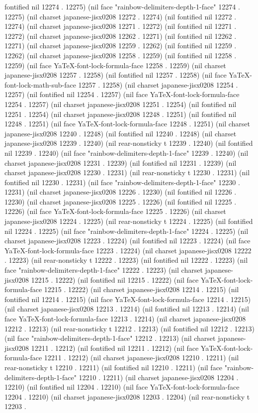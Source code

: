 fontified nil 12274 . 12275) (nil face "rainbow-delimiters-depth-1-face" 12274 . 12275) (nil charset japanese-jisx0208 12272 . 12274) (nil fontified nil 12272 . 12274) (nil charset japanese-jisx0208 12271 . 12272) (nil fontified nil 12271 . 12272) (nil charset japanese-jisx0208 12262 . 12271) (nil fontified nil 12262 . 12271) (nil charset japanese-jisx0208 12259 . 12262) (nil fontified nil 12259 . 12262) (nil charset japanese-jisx0208 12258 . 12259) (nil fontified nil 12258 . 12259) (nil face YaTeX-font-lock-formula-face 12258 . 12259) (nil charset japanese-jisx0208 12257 . 12258) (nil fontified nil 12257 . 12258) (nil face YaTeX-font-lock-math-sub-face 12257 . 12258) (nil charset japanese-jisx0208 12254 . 12257) (nil fontified nil 12254 . 12257) (nil face YaTeX-font-lock-formula-face 12254 . 12257) (nil charset japanese-jisx0208 12251 . 12254) (nil fontified nil 12251 . 12254) (nil charset japanese-jisx0208 12248 . 12251) (nil fontified nil 12248 . 12251) (nil face YaTeX-font-lock-formula-face 12248 . 12251) (nil charset japanese-jisx0208 12240 . 12248) (nil fontified nil 12240 . 12248) (nil charset japanese-jisx0208 12239 . 12240) (nil rear-nonsticky t 12239 . 12240) (nil fontified nil 12239 . 12240) (nil face "rainbow-delimiters-depth-1-face" 12239 . 12240) (nil charset japanese-jisx0208 12231 . 12239) (nil fontified nil 12231 . 12239) (nil charset japanese-jisx0208 12230 . 12231) (nil rear-nonsticky t 12230 . 12231) (nil fontified nil 12230 . 12231) (nil face "rainbow-delimiters-depth-1-face" 12230 . 12231) (nil charset japanese-jisx0208 12226 . 12230) (nil fontified nil 12226 . 12230) (nil charset japanese-jisx0208 12225 . 12226) (nil fontified nil 12225 . 12226) (nil face YaTeX-font-lock-formula-face 12225 . 12226) (nil charset japanese-jisx0208 12224 . 12225) (nil rear-nonsticky t 12224 . 12225) (nil fontified nil 12224 . 12225) (nil face "rainbow-delimiters-depth-1-face" 12224 . 12225) (nil charset japanese-jisx0208 12223 . 12224) (nil fontified nil 12223 . 12224) (nil face YaTeX-font-lock-formula-face 12223 . 12224) (nil charset japanese-jisx0208 12222 . 12223) (nil rear-nonsticky t 12222 . 12223) (nil fontified nil 12222 . 12223) (nil face "rainbow-delimiters-depth-1-face" 12222 . 12223) (nil charset japanese-jisx0208 12215 . 12222) (nil fontified nil 12215 . 12222) (nil face YaTeX-font-lock-formula-face 12215 . 12222) (nil charset japanese-jisx0208 12214 . 12215) (nil fontified nil 12214 . 12215) (nil face YaTeX-font-lock-formula-face 12214 . 12215) (nil charset japanese-jisx0208 12213 . 12214) (nil fontified nil 12213 . 12214) (nil face YaTeX-font-lock-formula-face 12213 . 12214) (nil charset japanese-jisx0208 12212 . 12213) (nil rear-nonsticky t 12212 . 12213) (nil fontified nil 12212 . 12213) (nil face "rainbow-delimiters-depth-1-face" 12212 . 12213) (nil charset japanese-jisx0208 12211 . 12212) (nil fontified nil 12211 . 12212) (nil face YaTeX-font-lock-formula-face 12211 . 12212) (nil charset japanese-jisx0208 12210 . 12211) (nil rear-nonsticky t 12210 . 12211) (nil fontified nil 12210 . 12211) (nil face "rainbow-delimiters-depth-1-face" 12210 . 12211) (nil charset japanese-jisx0208 12204 . 12210) (nil fontified nil 12204 . 12210) (nil face YaTeX-font-lock-formula-face 12204 . 12210) (nil charset japanese-jisx0208 12203 . 12204) (nil rear-nonsticky t 12203 . 
